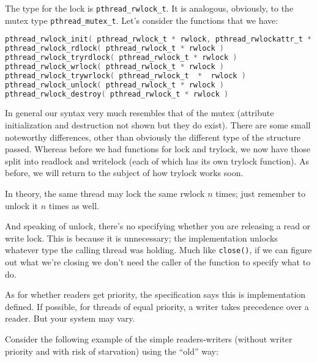 The type for the lock is \texttt{pthread\_rwlock\_t}. It is analogous, obviously, to the mutex type \texttt{pthread\_mutex\_t}. Let's consider the functions that we have:

\begin{lstlisting}[language=C]
pthread_rwlock_init( pthread_rwlock_t * rwlock, pthread_rwlockattr_t * attr )
pthread_rwlock_rdlock( pthread_rwlock_t * rwlock )
pthread_rwlock_tryrdlock( pthread_rwlock_t * rwlock )
pthread_rwlock_wrlock( pthread_rwlock_t * rwlock )
pthread_rwlock_trywrlock( pthread_rwlock_t  *  rwlock )
pthread_rwlock_unlock( pthread_rwlock_t * rwlock )
pthread_rwlock_destroy( pthread_rwlock_t * rwlock )
\end{lstlisting}

In general our syntax very much resembles that of the mutex (attribute initialization and destruction not shown but they do exist). There are some small noteworthy differences, other than obviously the different type of the structure passed. Whereas before we had functions for lock and trylock, we now have those split into readlock and writelock (each of which has its own trylock function). As before, we will return to the subject of how trylock works soon.

In theory, the same thread may lock the same rwlock $n$ times; just remember to unlock it $n$ times as well.

And speaking of unlock, there's no specifying whether you are releasing a read or write lock. This is because it is unnecessary; the implementation unlocks whatever type the calling thread was holding. Much like \texttt{close()}, if we can figure out what we're closing we don't need the caller of the function to specify what to do.

As for whether readers get priority, the specification says this is implementation defined. If possible, for threads of equal priority, a writer takes precedence over a reader. But your system may vary.

Consider the following example of the simple readers-writers (without writer priority and with risk of starvation) using the ``old'' way:


